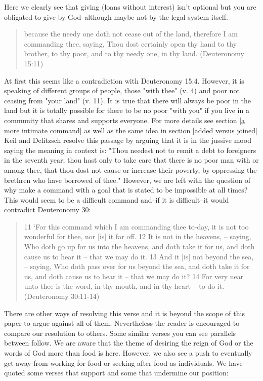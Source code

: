 \documentclass[11pt]{article}
\begin{document}
\noindent Here we clearly see that giving (loans without interest) isn't optional but you are obligated to give by God--although maybe not by the legal system itself.
\begin{quote}
because the needy one doth not cease out of the land, therefore I am commanding thee, saying, Thou dost certainly open thy hand to thy brother, to thy poor, and to thy needy one, in thy land. (Deuteronomy 15:11)
\end{quote}
At first this seems like a contradiction with Deuteronomy 15:4. However, it is speaking of different groups of people, those "with thee" (v. 4) and poor not ceasing from "your land" (v. 11). It is true that there will always be poor in the land but it is totally possible for there to be no poor "with you" if you live in a community that shares and supports everyone. For more details see section \ref{a more intimate command} as well as the same idea in section \ref{added versus joined}
Keil and Delitzsch resolve this passage by arguing that it is in the jussive mood saying the meaning in context is: "Thou needest not to remit a debt to foreigners in the seventh year; thou hast only to take care that there is no poor man with or among thee, that thou dost not cause or increase their poverty, by oppressing the brethren who have borrowed of thee." \cite{jussive mood kd} However, we are left with the question of why make a command with a goal that is stated to be impossible at all times? This would seem to be a difficult command and--if it is difficult--it would contradict Deuteronomy 30:
\begin{quote}
11 `For this command which I am commanding thee to-day, it is not too wonderful for thee, nor [is] it far off.
12 It is not in the heavens, -- saying, Who doth go up for us into the heavens, and doth take it for us, and doth cause us to hear it -- that we may do it.
13 And it [is] not beyond the sea, -- saying, Who doth pass over for us beyond the sea, and doth take it for us, and doth cause us to hear it -- that we may do it?
14 For very near unto thee is the word, in thy mouth, and in thy heart -- to do it. (Deuteronomy 30:11-14)
\end{quote}
There are other ways of resolving this verse and it is beyond the scope of this paper to argue against all of them. Nevertheless the reader is encouraged to compare our resolution to others. Some similar verses you can see parallels between follow. We are aware that the theme of desiring the reign of God or the words of God more than food is here. However, we also see a push to eventually get away from working for food or seeking after food as individuals. We have quoted some verses that support and some that undermine our position:
\end{document}
